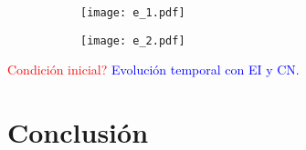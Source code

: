 \documentclass[aps,prb,twocolumn,superscriptaddress,floatfix,longbibliography,10pt]{revtex4-2}
\begin{document}
\begin{figure}
  \centering
  \begin{subfigure}[b]{0.3\textwidth}
      \centering
      \texttt{[image: e\_1.pdf]}
      \caption{}
      \label{fig:e_1}
  \end{subfigure}
  \hfill
  \begin{subfigure}[b]{0.3\textwidth}
      \centering
      \texttt{[image: e\_2.pdf]}
      \caption{}
      \label{fig:e_2}
  \end{subfigure}
     \caption{}
     \label{fig:e}
\end{figure}


\textcolor{red}{Condición inicial?}
\textcolor{blue}{Evolución temporal con EI y CN.}








\section{Conclusión}


\end{document}
